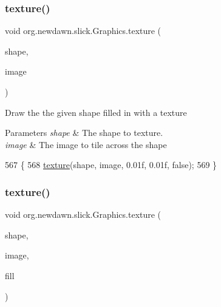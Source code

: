 \subsubsection{\texorpdfstring{texture()}{texture()}\hspace{0.1cm}{\footnotesize\ttfamily [1/6]}}
{\footnotesize\ttfamily void org.\+newdawn.\+slick.\+Graphics.\+texture (\begin{DoxyParamCaption}\item[{\mbox{\hyperlink{classorg_1_1newdawn_1_1slick_1_1geom_1_1_shape}{Shape}}}]{shape,  }\item[{\mbox{\hyperlink{classorg_1_1newdawn_1_1slick_1_1_image}{Image}}}]{image }\end{DoxyParamCaption})\hspace{0.3cm}{\ttfamily [inline]}}

Draw the the given shape filled in with a texture


\begin{DoxyParams}{Parameters}
{\em shape} & The shape to texture. \\
\hline
{\em image} & The image to tile across the shape \\
\hline
\end{DoxyParams}

\begin{DoxyCode}
567                                                   \{
568         \mbox{\hyperlink{classorg_1_1newdawn_1_1slick_1_1_graphics_a3139bc656ae2e7d8d5e974300ace7895}{texture}}(shape, image, 0.01f, 0.01f, \textcolor{keyword}{false});
569     \}
\end{DoxyCode}
\mbox{\label{classorg_1_1newdawn_1_1slick_1_1_graphics_aacd46e4c18d1aedcf0e15a70ec4e0757}} 
\subsubsection{\texorpdfstring{texture()}{texture()}\hspace{0.1cm}{\footnotesize\ttfamily [2/6]}}
{\footnotesize\ttfamily void org.\+newdawn.\+slick.\+Graphics.\+texture (\begin{DoxyParamCaption}\item[{\mbox{\hyperlink{classorg_1_1newdawn_1_1slick_1_1geom_1_1_shape}{Shape}}}]{shape,  }\item[{\mbox{\hyperlink{classorg_1_1newdawn_1_1slick_1_1_image}{Image}}}]{image,  }\item[{\mbox{\hyperlink{interfaceorg_1_1newdawn_1_1slick_1_1_shape_fill}{Shape\+Fill}}}]{fill }\end{DoxyParamCaption})\hspace{0.3cm}{\ttfamily [inline]}}

